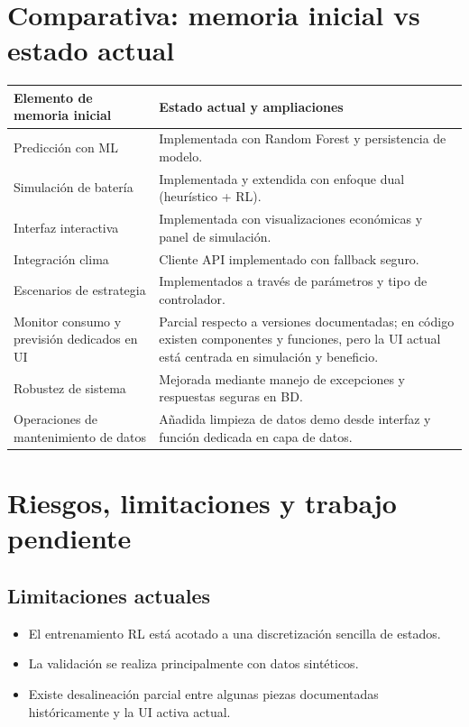 \documentclass[12pt,a4paper]{article}
\begin{document}
\section{Comparativa: memoria inicial vs estado actual}
\begin{longtable}{>{\raggedright\arraybackslash}p{} p{}}
\toprule
\textbf{Elemento de memoria inicial} & \textbf{Estado actual y ampliaciones} \\
\midrule
Predicci\'on con ML & Implementada con Random Forest y persistencia de modelo. \\
Simulaci\'on de bater\'ia & Implementada y extendida con enfoque dual (heur\'istico + RL). \\
Interfaz interactiva & Implementada con visualizaciones econ\'omicas y panel de simulaci\'on. \\
Integraci\'on clima & Cliente API implementado con fallback seguro. \\
Escenarios de estrategia & Implementados a trav\'es de par\'ametros y tipo de controlador. \\
Monitor consumo y previsi\'on dedicados en UI & Parcial respecto a versiones documentadas; en c\'odigo existen componentes y funciones, pero la UI actual est\'a centrada en simulaci\'on y beneficio. \\
Robustez de sistema & Mejorada mediante manejo de excepciones y respuestas seguras en BD. \\
Operaciones de mantenimiento de datos & A\~nadida limpieza de datos demo desde interfaz y funci\'on dedicada en capa de datos. \\
\bottomrule
\end{longtable}

\section{Riesgos, limitaciones y trabajo pendiente}
\subsection{Limitaciones actuales}
\begin{itemize}
    \item El entrenamiento RL est\'a acotado a una discretizaci\'on sencilla de estados.
    \item La validaci\'on se realiza principalmente con datos sint\'eticos.
    \item Existe desalineaci\'on parcial entre algunas piezas documentadas hist\'oricamente y la UI activa actual.
\end{itemize}
\end{document}
